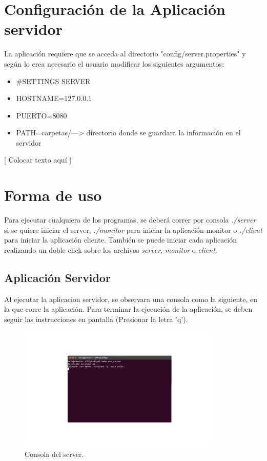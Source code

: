 \documentclass{article}
\begin{document}
\bigskip




\section{Configuración de la Aplicación servidor}
	
	La aplicación requiere que se acceda al directorio "config/server.properties" y según lo crea necesario el usuario modificar los siguientes argumentos:
\begin{itemize}
		\item	#SETTINGS SERVER
		\item	HOSTNAME=127.0.0.1
		\item	PUERTO=8080
		\item	PATH=carpetas/---> directorio donde se guardara la información en el servidor
\end{itemize}
\bigskip



[ Colocar texto aquí ]
\section{Forma de uso}
	
	Para ejecutar cualquiera de los programas, se deberá correr por consola \textit{./server} si se quiere iniciar el server, \textit{./monitor} para iniciar la aplicación monitor o \textit{./client} para iniciar la aplicación cliente. También se puede iniciar cada aplicación realizando un doble click sobre los archivos \textit{server}, \textit{monitor} o \textit{client}.

\subsection{Aplicación Servidor}
\smallskip 
	Al ejecutar la aplicacion servidor, se observara una consola como la siguiente, en la que corre la aplicación. Para terminar la ejecución de la aplicación, se deben seguir las instrucciones en pantalla (Presionar la letra 'q').	
	\begin{figure}[h]
       \centering
       \includegraphics[width=0.85\textwidth]{Server.png}
	\bigskip
       \caption{Consola del server.}
	\end{figure}
\end{document}
